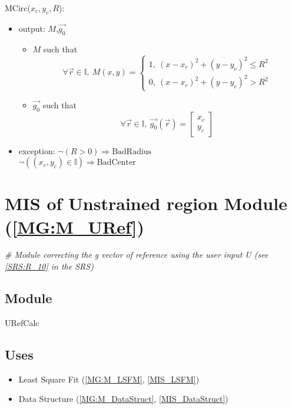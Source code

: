 \documentclass[12pt, titlepage]{article}
\begin{document}
\noindent MCirc($x_c,y_c,R$):
\begin{itemize} 
\item output: $M$,$\overrightarrow{g_0}$
	\begin{itemize}
	\item $M$ such that
	\begin{equation*}
	\forall \vec{r} \in \mathbb{I}, \ M(x,y)=\begin{cases}
	1, \ (x-x_c)^2+(y-y_c)^2\leq R^2 \\
	0, \ (x-x_c)^2+(y-y_c)^2> R^2
	\end{cases}
	\end{equation*}
	\item $\overrightarrow{g_0}$ such that
	\begin{equation*}
	\forall \vec{r} \in \mathbb{I}, \ \overrightarrow{g_0}(\vec{r})=\begin{bmatrix}
	x_c\\
	y_c
	\end{bmatrix}
	\end{equation*}
	\end{itemize}
\item exception:
\newline
$\neg (R>0) \Rightarrow \text{BadRadius}$\\
$\neg ((x_c,y_c) \in \mathbb{I}) \Rightarrow \text{BadCenter}$
\end{itemize}

\section{MIS of Unstrained region Module (\texorpdfstring{\cref{MG:M_URef}}))} 
\label{MIS_URef}

\noindent\textit{{\#} Module correcting the g vector of reference using the user 
input U (see \cref{SRS:R_10} in the SRS)}

\subsection{Module}
URefCalc
\subsection{Uses}
\begin{itemize}
\item Least Square Fit (\cref{MG:M_LSFM}, \cref{MIS_LSFM})
\item Data Structure (\cref{MG:M_DataStruct}, \cref{MIS_DataStruct})
\end{itemize}
\end{document}
